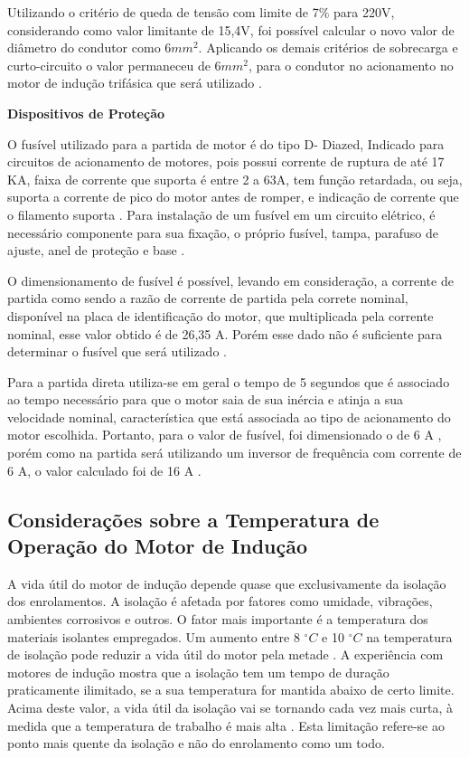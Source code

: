 	Utilizando o critério de queda de tensão com limite de 7\% para 220V, considerando como valor limitante de 15,4V, foi possível calcular o novo valor de diâmetro do condutor como 6$mm^{2}$. Aplicando os demais critérios de sobrecarga e curto-circuito o valor permaneceu de 6$mm^{2}$, para o condutor no acionamento no motor de indução trifásica que será utilizado \cite{NBR5410}.

	\textbf{Dispositivos de Proteção}

	O fusível utilizado para a partida de motor é do tipo D- Diazed, Indicado para circuitos de acionamento de motores, pois possui corrente de ruptura de até 17 KA, faixa de corrente que suporta é entre 2 a 63A, tem função retardada, ou seja, suporta a corrente de pico do motor antes de romper, e indicação de corrente que o filamento suporta \cite{WEG04}. Para instalação de um fusível em um circuito elétrico, é necessário componente para sua fixação, o próprio fusível, tampa, parafuso de ajuste, anel de proteção e base \cite{WEG04}.
	
	O dimensionamento de fusível é possível, levando em consideração, a corrente de partida como sendo a razão de corrente de partida pela correte nominal, disponível na placa de identificação do motor, que multiplicada pela corrente nominal, esse valor obtido é de 26,35 A. Porém esse dado não é suficiente para determinar o fusível que será utilizado \cite{WEG04}.
	
	Para a partida direta utiliza-se em geral o tempo de 5 segundos que é associado ao tempo necessário para que o motor saia de sua inércia e atinja a sua velocidade nominal, característica que está associada ao tipo de acionamento do motor escolhida. Portanto, para o valor de fusível, foi dimensionado o de 6 A , porém como na partida será utilizando um inversor de frequência com corrente de 6 A, o valor calculado foi de 16 A \cite{WEG04} \cite{NBR5410}.


\subsection{Considerações sobre a Temperatura de Operação do Motor de Indução}
	
	A vida útil do motor de indução depende quase que exclusivamente da isolação dos enrolamentos. A isolação é afetada por fatores como umidade, vibrações, ambientes corrosivos e outros. O fator mais importante é a temperatura dos materiais isolantes empregados. Um aumento entre 8 $^{\circ}C$ e 10 $^{\circ}C$ na temperatura de isolação pode reduzir a vida útil do motor pela metade \cite{Goncalez}. A experiência com motores de indução mostra que a isolação tem um tempo de duração praticamente ilimitado, se a sua temperatura for mantida abaixo de certo limite. Acima deste valor, a vida útil da isolação vai se tornando cada vez mais curta, à medida que a temperatura de trabalho é mais alta \cite{Goncalez}. Esta limitação refere-se ao ponto mais quente da isolação e não do enrolamento como um todo.
	
